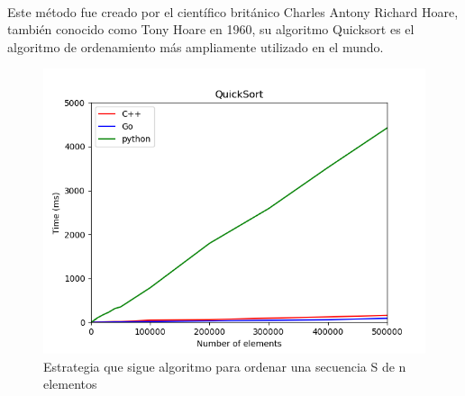 \documentclass{article}
\begin{document}
        \paragraph {}
        Este método fue creado por el científico británico Charles Antony Richard Hoare, también conocido como Tony Hoare en 1960, su algoritmo Quicksort es el algoritmo de ordenamiento más ampliamente utilizado en el mundo.
           \begin{figure}[h!]
            \centering
            \includegraphics[width=12cm]{img/QuickSort_1.png}
            \caption{Estrategia que sigue algoritmo para ordenar una secuencia S de n elementos}
            \label{fig:mergesort}
        \end {figure}
\end{document}
